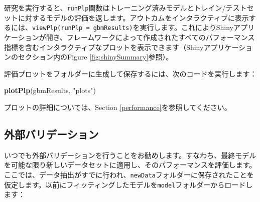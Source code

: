 \documentclass[
  11pt]{book}
\newenvironment{Shaded}{\begin{snugshade}}{\end{snugshade}}
\newcommand{\FunctionTok}[1]{\textcolor[rgb]{0.13,0.29,0.53}{\textbf{#1}}}
\newcommand{\NormalTok}[1]{#1}
\newcommand{\StringTok}[1]{\textcolor[rgb]{0.31,0.60,0.02}{#1}}
\theoremstyle{definition}
\theoremstyle{definition}
\theoremstyle{definition}
\theoremstyle{definition}
\theoremstyle{remark}
\begin{document}
研究を実行すると、\texttt{runPlp}関数はトレーニング済みモデルとトレイン/テストセットに対するモデルの評価を返します。アウトカムをインタラクティブに表示するには、\texttt{viewPlp(runPlp\ =\ gbmResults)}を実行します。これによりShinyアプリケーションが開き、フレームワークによって作成されたすべてのパフォーマンス指標を含むインタラクティブなプロットを表示できます（Shinyアプリケーションのセクション内のFigure \ref{fig:shinySummary}参照）。

評価プロットをフォルダーに生成して保存するには、次のコードを実行します：

\begin{Shaded}
\begin{Highlighting}[]
\FunctionTok{plotPlp}\NormalTok{(gbmResults, }\StringTok{"plots"}\NormalTok{)}
\end{Highlighting}
\end{Shaded}

プロットの詳細については、Section \ref{performance}を参照してください。

\subsection{外部バリデーション}\label{ux5916ux90e8ux30d0ux30eaux30c7ux30fcux30b7ux30e7ux30f3}

いつでも外部バリデーションを行うことをお勧めします。すなわち、最終モデルを可能な限り新しいデータセットに適用し、そのパフォーマンスを評価します。ここでは、データ抽出がすでに行われ、\texttt{newData}フォルダーに保存されたことを仮定します。以前にフィッティングしたモデルを\texttt{model}フォルダーからロードします：
\end{document}
